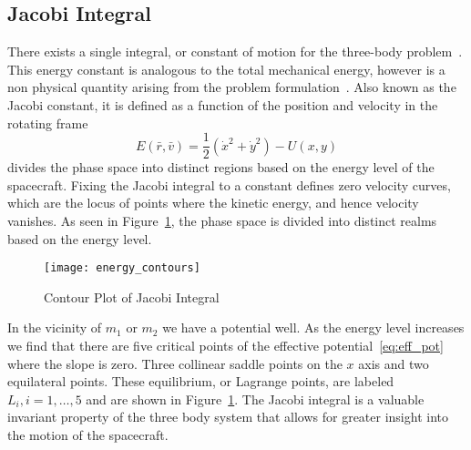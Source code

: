 \documentclass[letterpaper, preprint, paper,11pt]{AAS}	%
\begin{document}
\subsection{Jacobi Integral}
There exists a single integral, or constant of motion for the three-body problem~\cite{lanczos1970,szebehely1967}.
This energy constant is analogous to the total mechanical energy, however is a non physical quantity arising from the problem formulation~\cite{szebehely1967}.
Also known as the Jacobi constant, it is defined as a function of the position and velocity in the rotating frame
\begin{equation}
	E\left( \bar{r} , \bar{v} \right) = \frac{1}{2}\left( \dot{x}^2 + \dot{y}^2\right) - U\left(x,y \right)
	\label{eq:jacobi}
\end{equation}
 divides the phase space into distinct regions based on the energy level of the spacecraft.
Fixing the Jacobi integral to a constant defines zero velocity curves, which are the locus of points where the kinetic energy, and hence velocity vanishes.
As seen in Figure~\ref{fig:energy_contour}, the phase space is divided into distinct realms based on the energy level.
\begin{figure}[htbp]
	\centering
	\texttt{[image: energy\_contours]}
	\caption{Contour Plot of Jacobi Integral}
	\label{fig:energy_contour}
\end{figure} 
In the vicinity of \( m_1\) or \(m_2\) we have a potential well. 
As the energy level increases we find that there are five critical points of the effective potential~\cref{eq:eff_pot} where the slope is zero.
Three collinear saddle points on the \(x\) axis and two equilateral points.
These equilibrium, or Lagrange points, are labeled \( L_i, i = 1, \hdots, 5 \) and are shown in Figure~\ref{fig:energy_contour}.
The Jacobi integral is a valuable invariant property of the three body system that allows for greater insight into the motion of the spacecraft.

\end{document}
